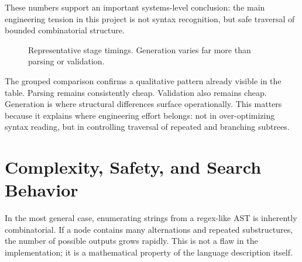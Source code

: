 \documentclass[a4paper,12pt]{article}
\begin{document}
These numbers support an important systems-level conclusion: the main engineering tension in this project is not syntax recognition, but safe traversal of bounded combinatorial structure.

\begin{figure}[H]
    \centering
    \caption{Representative stage timings. Generation varies far more than parsing or validation.}
\end{figure}

The grouped comparison confirms a qualitative pattern already visible in the table. Parsing remains consistently cheap. Validation also remains cheap. Generation is where structural differences surface operationally. This matters because it explains where engineering effort belongs: not in over-optimizing syntax reading, but in controlling traversal of repeated and branching subtrees.

\section{Complexity, Safety, and Search Behavior}

In the most general case, enumerating strings from a regex-like AST is inherently combinatorial. If a node contains many alternations and repeated substructures, the number of possible outputs grows rapidly. This is not a flaw in the implementation; it is a mathematical property of the language description itself.
\end{document}
